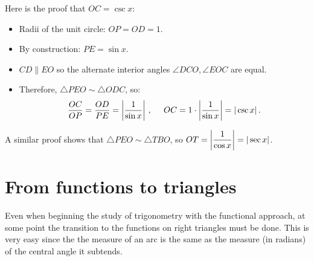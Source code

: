 Here is the proof that $OC=\csc x$:
\begin{itemize}
\item Radii of the unit circle: $OP = OD =1$.
\item By construction: $PE = \sin x$.
\item $CD \parallel EO$ so the alternate interior angles $\angle DCO, \angle EOC$ are equal.
\item Therefore, $\triangle PEO \sim \triangle ODC$, so:
\[
\frac{OC}{OP} = \frac{OD}{PE}=\left|\frac{1}{\sin x}\right|\,,\;\;\;\;\;
OC = 1\cdot\left|\displaystyle\frac{1}{\sin x}\right|=|\csc x|\,.
\]
\end{itemize}
A similar proof shows that $\triangle PEO \sim \triangle TBO$, so $OT = \left|\displaystyle\frac{1}{\cos x}\right|=|\sec x|$.



\section{From functions to triangles}

Even when beginning the study of trigonometry with the functional approach, at some point the transition to the functions on right triangles must be done.
This is very easy since the the measure of an arc is the same as the measure (in radians) of the central angle it subtends.

